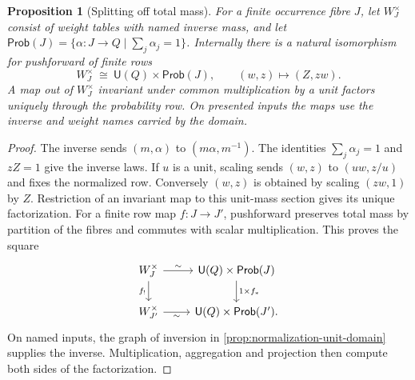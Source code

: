 \documentclass[11pt,a4paper]{article}
\newtheorem{proposition}[proposition]{Proposition}
\theoremstyle{definition}
\theoremstyle{remark}\newaliascnt{remark}{theorem}
\numberwithin{equation}{section}
\begin{document}
\begin{proposition}[Splitting off total mass]\label{thm:mass-split}
For a finite occurrence fibre $J$, let $W^\times_J$ consist of weight tables with named inverse mass, and let $\mathsf{Prob}(J)=\{\alpha:J\to Q\mid\sum_j\alpha_j=1\}$. Internally there is a natural isomorphism for pushforward of finite rows
\[
 W^\times_J\ \cong\ \mathsf U(Q)\times\mathsf{Prob}(J),
 \qquad (w,z)\longmapsto(Z,zw).
\]
A map out of $W^\times_J$ invariant under common multiplication by a unit factors uniquely through the probability row. On presented inputs the maps use the inverse and weight names carried by the domain.
\end{proposition}
\begin{proof}
The inverse sends $(m,\alpha)$ to $(m\alpha,m^{-1})$. The identities $\sum_j\alpha_j=1$ and $zZ=1$ give the inverse laws. If $u$ is a unit, scaling sends $(w,z)$ to $(uw,z/u)$ and fixes the normalized row. Conversely $(w,z)$ is obtained by scaling $(zw,1)$ by $Z$. Restriction of an invariant map to this unit-mass section gives its unique factorization. For a finite row map $f:J\to J'$, pushforward preserves total mass by partition of the fibres and commutes with scalar multiplication. This proves the square
\[
\begin{tikzcd}
 W^\times_J\arrow[r,"\sim"]\arrow[d,"f_!"']&
 \mathsf U(Q)\times\mathsf{Prob}(J)\arrow[d,"{1\times f_*}"]\\
 W^\times_{J'}\arrow[r,"\sim"']&\mathsf U(Q)\times\mathsf{Prob}(J').
\end{tikzcd}
\]
On named inputs, the graph of inversion in \cref{prop:normalization-unit-domain} supplies the inverse. Multiplication, aggregation and projection then compute both sides of the factorization.
\end{proof}
\end{document}
